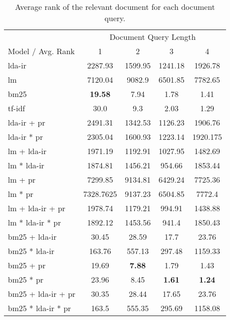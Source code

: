 \begin{table}[h]
	\centering
	\caption{Average rank of the relevant document for each document query.}
	\begin{tabular}{l|c|c|c|c}
		& \multicolumn{4}{c}{Document Query Length} \\
		Model / Avg. Rank & 1 & 2 & 3 & 4 \\
		\midrule
		\gls{lda}-\gls{ir} & 2287.93 & 1599.95 & 1241.18 & 1926.78 \\
		\gls{lm} & 7120.04 & 9082.9 & 6501.85 & 7782.65 \\
		\gls{bm25} & \textbf{19.58} & 7.94 & 1.78 & 1.41 \\
		\gls{tf-idf} & 30.0 & 9.3 & 2.03 & 1.29 \\
		\gls{lda}-\gls{ir} + \gls{pr} & 2491.31 & 1342.53 & 1126.23 & 1906.76\\
		\gls{lda}-\gls{ir} * \gls{pr} & 2305.04 & 1600.93 & 1223.14 & 1920.175\\
		\gls{lm} + \gls{lda}-\gls{ir} & 1971.19 & 1192.91 & 1027.95 & 1482.69 \\
		\gls{lm} * \gls{lda}-\gls{ir} & 1874.81 & 1456.21 & 954.66 & 1853.44 \\
		\gls{lm} + \gls{pr} & 7299.85 & 9134.81 & 6429.24 & 7725.36 \\
		\gls{lm} * \gls{pr} & 7328.7625 & 9137.23 & 6504.85 & 7772.4\\
		\gls{lm} + \gls{lda}-\gls{ir} + \gls{pr} & 1978.74 & 1179.21 & 994.91 & 1438.88 \\
		\gls{lm} * \gls{lda}-\gls{ir} * \gls{pr} & 1892.12 & 1453.56 & 941.4 & 1850.43 \\
		\gls{bm25} + \gls{lda}-\gls{ir} & 30.45 & 28.59 & 17.7 & 23.76 \\
		\gls{bm25} * \gls{lda}-\gls{ir} & 163.76 & 557.13 & 297.48 & 1159.33 \\
		\gls{bm25} + \gls{pr} & 19.69 & \textbf{7.88} & 1.79 & 1.43\\
		\gls{bm25} * \gls{pr} & 23.96 & 8.45 & \textbf{1.61} & \textbf{1.24}\\
		\gls{bm25} + \gls{lda}-\gls{ir} + \gls{pr} & 30.35 & 28.44 & 17.65 & 23.76\\
		\gls{bm25} * \gls{lda}-\gls{ir} * \gls{pr} & 163.5 & 555.35 & 295.69 & 1158.08\\
	\end{tabular}
	
	\label{tab:hit_results}
\end{table}
